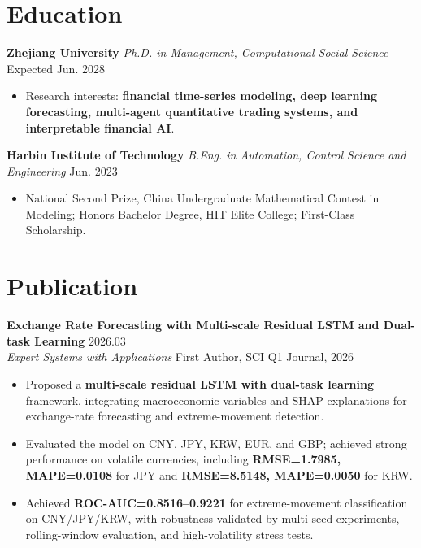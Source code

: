 \documentclass{resume}
\begin{document}
\small


\ResumeTitle

\vspace{0.20cm}

\section{\textbf{Education}}

\noindent
\textbf{Zhejiang University} 
\textit{Ph.D. in Management, Computational Social Science} \hfill Expected Jun. 2028
\begin{itemize}
    \item Research interests: \textbf{financial time-series modeling, deep learning forecasting, multi-agent quantitative trading systems, and interpretable financial AI}.
\end{itemize}

\noindent
\textbf{Harbin Institute of Technology} 
\textit{B.Eng. in Automation, Control Science and Engineering} \hfill Jun. 2023
\begin{itemize}
    \item National Second Prize, China Undergraduate Mathematical Contest in Modeling; Honors Bachelor Degree, HIT Elite College; First-Class Scholarship.
\end{itemize}


\section{\textbf{Publication}}

\noindent
\textbf{Exchange Rate Forecasting with Multi-scale Residual LSTM and Dual-task Learning} \hfill 2026.03 \\
\textit{Expert Systems with Applications} \hfill First Author, SCI Q1 Journal, 2026
\begin{itemize}
    \item Proposed a \textbf{multi-scale residual LSTM with dual-task learning} framework, integrating macroeconomic variables and SHAP explanations for exchange-rate forecasting and extreme-movement detection.
    \item Evaluated the model on CNY, JPY, KRW, EUR, and GBP; achieved strong performance on volatile currencies, including \textbf{RMSE=1.7985, MAPE=0.0108} for JPY and \textbf{RMSE=8.5148, MAPE=0.0050} for KRW.
    \item Achieved \textbf{ROC-AUC=0.8516--0.9221} for extreme-movement classification on CNY/JPY/KRW, with robustness validated by multi-seed experiments, rolling-window evaluation, and high-volatility stress tests.
\end{itemize}
\end{document}
